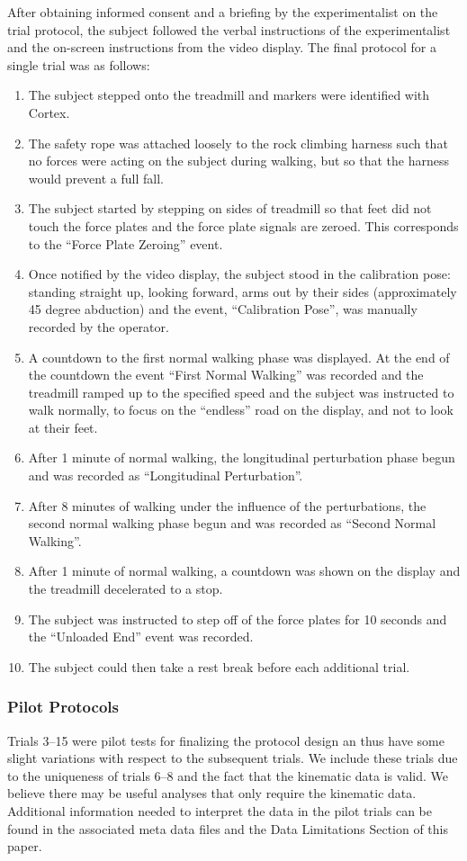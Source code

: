 \documentclass[fleqn,12pt]{wlpeerj}
\begin{document}
After obtaining informed consent and a briefing by the experimentalist on the
trial protocol, the subject followed the verbal instructions of the
experimentalist and the on-screen instructions from the video display. The
final protocol for a single trial was as follows:
%
\begin{enumerate}
  \item The subject stepped onto the treadmill and markers were identified with
    Cortex.
  \item The safety rope was attached loosely to the rock climbing harness such
    that no forces were acting on the subject during walking, but so that the
    harness would prevent a full fall.
  \item The subject started by stepping on sides of treadmill so that feet did
    not touch the force plates and the force plate signals are zeroed. This
    corresponds to the ``Force Plate Zeroing'' event.
  \item Once notified by the video display, the subject stood in the
    calibration pose: standing straight up, looking forward, arms out by their
    sides (approximately 45 degree abduction) and the event, ``Calibration
    Pose'', was manually recorded by the operator.
  \item A countdown to the first normal walking phase was displayed. At the end
    of the countdown the event ``First Normal Walking'' was recorded and the
    treadmill ramped up to the specified speed and the subject was instructed
    to walk normally, to focus on the ``endless'' road on the display, and not
    to look at their feet.
  \item After 1 minute of normal walking, the longitudinal perturbation phase
    begun and was recorded as ``Longitudinal Perturbation''.
  \item After 8 minutes of walking under the influence of the perturbations,
    the second normal walking phase begun and was recorded as ``Second Normal
    Walking''.
  \item After 1 minute of normal walking, a countdown was shown on the display
    and the treadmill decelerated to a stop.
  \item The subject was instructed to step off of the force plates for 10
    seconds and the ``Unloaded End'' event was recorded.
  \item The subject could then take a rest break before each additional trial.
\end{enumerate}

\subsubsection*{Pilot Protocols}
%
Trials 3--15 were pilot tests for finalizing the protocol design an thus have
some slight variations with respect to the subsequent trials. We include these
trials due to the uniqueness of trials 6--8 and the fact that the kinematic
data is valid. We believe there may be useful analyses that only require the
kinematic data. Additional information needed to interpret the data in the
pilot trials can be found in the associated meta data files and the Data
Limitations Section of this paper.
\end{document}
